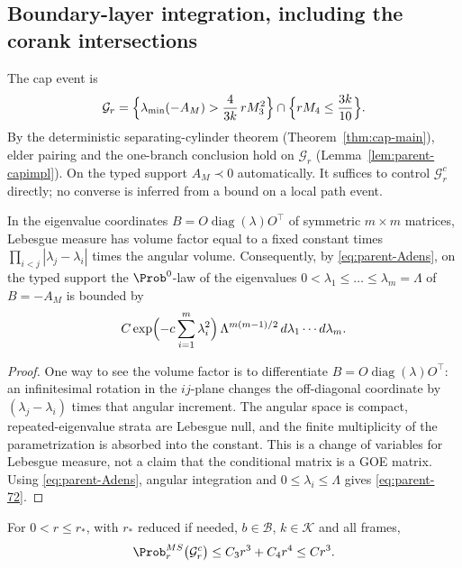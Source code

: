 \subsection{Boundary-layer integration, including the corank intersections}\label{ssec:parent-layer}

The cap event is
\begin{equation}\label{eq:parent-G}
\mathcal G_r=\Bigl\{\lambda_{\min}(-A_M)>\frac4{3k}\,rM_3^2\Bigr\}\cap\Bigl\{rM_4\le\frac{3k}{10}\Bigr\}.
\end{equation}
By the deterministic separating-cylinder theorem (Theorem~\ref{thm:cap-main}), elder pairing and the one-branch conclusion hold on $\mathcal G_r$ (Lemma~\ref{lem:parent-capimpl}). On the typed support $A_M\prec0$ automatically. It suffices to control $\mathcal G_r^c$ directly; no converse is inferred from a bound on a local path event.

\begin{lemma}\label{lem:parent-eigen}
In the eigenvalue coordinates $B=O\operatorname{diag}(\lambda)O^{\top}$ of symmetric $m\times m$ matrices, Lebesgue measure has volume factor equal to a fixed constant times $\prod_{i<j}|\lambda_j-\lambda_i|$ times the angular volume. Consequently, by \eqref{eq:parent-Adens}, on the typed support the $\Prob^0$-law of the eigenvalues $0<\lambda_1\le\dots\le\lambda_m=\Lambda$ of $B=-A_M$ is bounded by
\begin{equation}\label{eq:parent-72}
C\exp\Bigl(-c\sum_{i=1}^m\lambda_i^2\Bigr)\,\Lambda^{m(m-1)/2}\,d\lambda_1\cdots d\lambda_m .
\end{equation}
\end{lemma}

\begin{proof}
One way to see the volume factor is to differentiate $B=O\operatorname{diag}(\lambda)O^{\top}$: an infinitesimal rotation in the $ij$-plane changes the off-diagonal coordinate by $(\lambda_j-\lambda_i)$ times that angular increment. The angular space is compact, repeated-eigenvalue strata are Lebesgue null, and the finite multiplicity of the parametrization is absorbed into the constant. This is a change of variables for Lebesgue measure, not a claim that the conditional matrix is a GOE matrix. Using \eqref{eq:parent-Adens}, angular integration and $0\le\lambda_i\le\Lambda$ gives \eqref{eq:parent-72}.
\end{proof}

\begin{proposition}\label{prop:parent-layer}
For $0<r\le r_*$, with $r_*$ reduced if needed, $b\in\mathcal B$, $k\in\mathcal K$ and all frames,
\begin{equation}\label{eq:parent-78}
\Prob^{MS}_r\bigl(\mathcal G_r^c\bigr)\le C_3r^3+C_4r^4\le Cr^3 .
\end{equation}
\end{proposition}

